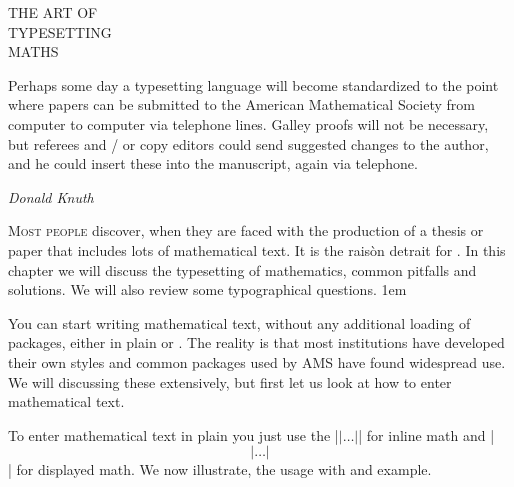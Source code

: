 \thispagestyle{empty}
    \begin{leftcolumn}
      {{\centering \huge  THE ART OF \\
       TYPESETTING\\
       MATHS\\}}
      \medskip
       {\justifying \small Perhaps some day a typesetting language will become standardized to the 
point where papers can be submitted to the American Mathematical Society 
from computer to computer via telephone lines. Galley proofs will not be 
necessary, but referees  and / or copy editors could send suggested changes to 
the author, and he could insert these into the manuscript, again via telephone.\par
\hfill \textit{Donald Knuth}}
\medskip
       \par
   \end{leftcolumn}
   \begin{rightcolumn}

     \vspace*{1.5\baselineskip}

  \centerline{}
      \begin{multicols}{2}
      \small
      \lettrine{M}{ost people} discover, \alltex when they are faced with the production of a thesis or paper that includes lots of
mathematical text. It is the rais\`on detrait for \tex. In this chapter we will discuss the typesetting of mathematics, common pitfalls and solutions. We will also review some typographical questions.
\parindent1em

You can start writing mathematical text, without any additional loading of packages, either in plain \tex or \latex. The reality is that most institutions have developed their own styles and common packages used by AMS have found widespread use. We will discussing these extensively, but first let us look at how to enter mathematical text. 

To enter mathematical text in plain \tex you just use the |$|\ldots|$| for inline math and |$$|\ldots|$$| for displayed math. We now illustrate, the usage with and example.
      \end{multicols}
   \end{rightcolumn}
\stoptemplate


